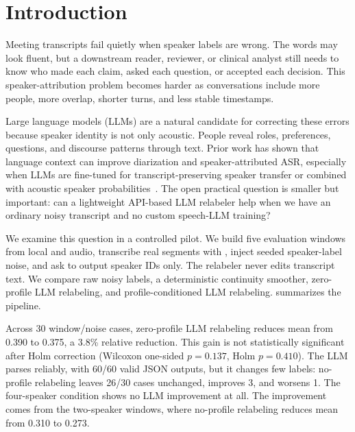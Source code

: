 \section{Introduction}
\label{sec:introduction}

Meeting transcripts fail quietly when speaker labels are wrong. The words may look fluent, but a downstream reader, reviewer, or clinical analyst still needs to know who made each claim, asked each question, or accepted each decision. This speaker-attribution problem becomes harder as conversations include more people, more overlap, shorter turns, and less stable timestamps.

Large language models (LLMs) are a natural candidate for correcting these errors because speaker identity is not only acoustic. People reveal roles, preferences, questions, and discourse patterns through text. Prior work has shown that language context can improve diarization and speaker-attributed ASR, especially when LLMs are fine-tuned for transcript-preserving speaker transfer or combined with acoustic speaker probabilities~\cite{wang2024diarizationlm,park2023enhancing,li2026dmasr}. The open practical question is smaller but important: can a lightweight API-based LLM relabeler help when we have an ordinary noisy transcript and no custom speech-LLM training?

 We examine this question in a controlled pilot. We build five evaluation windows from local \amisdm and \simsamu audio, transcribe real segments with \asrmodel, inject seeded speaker-label noise, and ask \relabelmodel to output speaker IDs only. The relabeler never edits transcript text. We compare raw noisy labels, a deterministic continuity smoother, zero-profile LLM relabeling, and profile-conditioned LLM relabeling.  summarizes the pipeline.

 Across 30 window/noise cases, zero-profile LLM relabeling reduces mean \wder from 0.390 to 0.375, a 3.8\% relative reduction. This gain is not statistically significant after Holm correction (Wilcoxon one-sided $p=0.137$, Holm $p=0.410$). The LLM parses reliably, with 60/60 valid JSON outputs, but it changes few labels: no-profile relabeling leaves 26/30 cases unchanged, improves 3, and worsens 1. The four-speaker \amisdm condition shows no LLM improvement at all. The improvement comes from the two-speaker \simsamu windows, where no-profile relabeling reduces mean \wder from 0.310 to 0.273.

